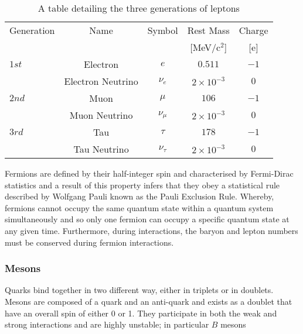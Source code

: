\documentclass[12pt,a4paper]{article}
\begin{document}
\par

\begin{table}[!h]
  \centering
  \caption{A table detailing the three generations of leptons} 
  \label{table}
  
  \begin{tabular}{l|c|c|c|c}
  \hline
    Generation & Name & Symbol & Rest Mass & Charge \\
     &  &  &  [MeV/c$^2$] & [e] \\
    \hline
    $1st$ & Electron & $e$ & $0.511$ & $-1$ \\
    $ $ & Electron Neutrino & $\nu_e$ & $2 \times 10^{-3}$ & $0$   \\
    \hline
    $2nd$ & Muon & $\mu$ & $106$ & $-1$ \\
    $ $ & Muon Neutrino & $\nu_{\mu}$ & $2 \times 10^{-3}$ & $0$ \\
    \hline
    $3rd$ & Tau & $\tau$ & $178 $ & $-1$ \\
    $ $ & Tau Neutrino & $\nu_{\tau}$ & $2 \times 10^{-3} $ & $0$ \\

    \hline
  \end{tabular}
\end{table}
\newpage

Fermions are defined by their half-integer spin and characterised by Fermi-Dirac statistics and a result of this property infers that they obey a statistical rule described by Wolfgang Pauli known as the Pauli Exclusion Rule. Whereby, fermions cannot occupy the same quantum state within a quantum system simultaneously and so only one fermion can occupy a specific quantum state at any given time. Furthermore, during interactions, the baryon and lepton numbers must be conserved during fermion interactions. \par 

\subsubsection{Mesons}
\par
Quarks bind together in two different way, either in triplets or in doublets. Mesons are composed of a quark and an anti-quark and exists as a doublet that have an overall spin of either 0 or 1. They participate in both the weak and strong interactions and are highly unstable; in particular $B$ mesons 
\end{document}

